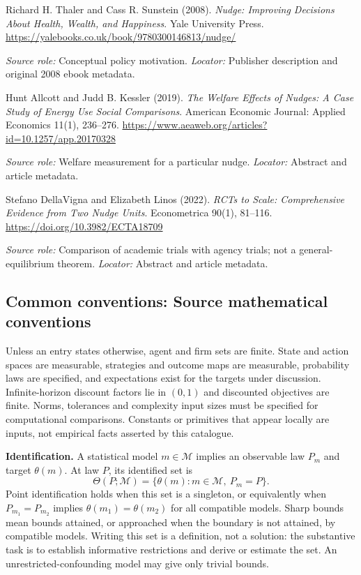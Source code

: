 \documentclass[11pt,a4paper]{article}
\begin{document}
\begin{enumerate}[label={[S\arabic*]},leftmargin=*]

\item Richard H. Thaler and Cass R. Sunstein (2008). \emph{Nudge: Improving Decisions About Health, Wealth, and Happiness}. Yale University Press. \url{https://yalebooks.co.uk/book/9780300146813/nudge/}\par \textit{Source role:} Conceptual policy motivation. \textit{Locator:} Publisher description and original 2008 ebook metadata.

\item Hunt Allcott and Judd B. Kessler (2019). \emph{The Welfare Effects of Nudges: A Case Study of Energy Use Social Comparisons}. American Economic Journal: Applied Economics 11(1), 236--276. \url{https://www.aeaweb.org/articles?id=10.1257/app.20170328}\par \textit{Source role:} Welfare measurement for a particular nudge. \textit{Locator:} Abstract and article metadata.

\item Stefano DellaVigna and Elizabeth Linos (2022). \emph{RCTs to Scale: Comprehensive Evidence from Two Nudge Units}. Econometrica 90(1), 81--116. \url{https://doi.org/10.3982/ECTA18709}\par \textit{Source role:} Comparison of academic trials with agency trials; not a general-equilibrium theorem. \textit{Locator:} Abstract and article metadata.

\end{enumerate}

\subsection*{Common conventions: Source mathematical conventions}

Unless an entry states otherwise, agent and firm sets are finite. State and action spaces are measurable, strategies and outcome maps are measurable, probability laws are specified, and expectations exist for the targets under discussion. Infinite-horizon discount factors lie in $(0,1)$ and discounted objectives are finite. Norms, tolerances and complexity input sizes must be specified for computational comparisons. Constants or primitives that appear locally are inputs, not empirical facts asserted by this catalogue.

\textbf{Identification.} A statistical model $m\in\mathcal M$ implies an observable law $P_m$ and target $\theta(m)$. At law $P$, its identified set is
\[
\Theta(P;\mathcal M)=\{\theta(m):m\in\mathcal M,\ P_m=P\}.
\]
Point identification holds when this set is a singleton, or equivalently when $P_{m_1}=P_{m_2}$ implies $\theta(m_1)=\theta(m_2)$ for all compatible models. Sharp bounds mean bounds attained, or approached when the boundary is not attained, by compatible models. Writing this set is a definition, not a solution: the substantive task is to establish informative restrictions and derive or estimate the set. An unrestricted-confounding model may give only trivial bounds.
\end{document}
